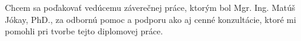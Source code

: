 Chcem sa poďakovať vedúcemu záverečnej práce, ktorým bol Mgr. Ing. Matúš Jókay, PhD., za odbornú pomoc a podporu ako aj cenné konzultácie, ktoré mi pomohli pri tvorbe tejto diplomovej práce.
